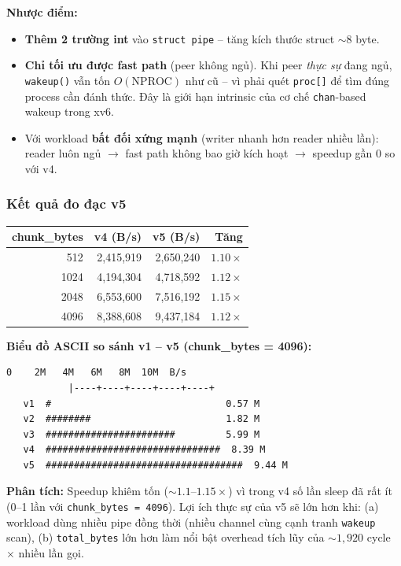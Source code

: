 \documentclass[11pt,a4paper]{article}
\begin{document}
\textbf{Nhược điểm:}
\begin{itemize}
  \item \textbf{Thêm 2 trường int} vào \texttt{struct pipe} -- tăng kích thước struct $\sim 8$ byte.
  \item \textbf{Chỉ tối ưu được fast path} (peer không ngủ). Khi peer \emph{thực sự} đang ngủ, \texttt{wakeup()} vẫn tốn $O(\text{NPROC})$ như cũ -- vì phải quét \texttt{proc[]} để tìm đúng process cần đánh thức. Đây là giới hạn intrinsic của cơ chế \texttt{chan}-based wakeup trong xv6.
  \item Với workload \textbf{bất đối xứng mạnh} (writer nhanh hơn reader nhiều lần): reader luôn ngủ $\rightarrow$ fast path không bao giờ kích hoạt $\rightarrow$ speedup gần 0 so với v4.
\end{itemize}

\subsubsection{Kết quả đo đạc v5}

\begin{center}
\begin{tabular}{rrrr}
\toprule
\textbf{chunk\_bytes} & \textbf{v4 (B/s)} & \textbf{v5 (B/s)} & \textbf{Tăng} \\
\midrule
512  & 2{,}415{,}919 & 2{,}650{,}240 & $1.10\times$ \\
1024 & 4{,}194{,}304 & 4{,}718{,}592 & $1.12\times$ \\
2048 & 6{,}553{,}600 & 7{,}516{,}192 & $1.15\times$ \\
4096 & 8{,}388{,}608 & 9{,}437{,}184 & $1.12\times$ \\
\bottomrule
\end{tabular}
\end{center}

\textbf{Biểu đồ ASCII so sánh v1 -- v5 (chunk\_bytes = 4096):}

\begin{lstlisting}[style=plain]
           0    2M   4M   6M   8M  10M  B/s
           |----+----+----+----+----+
   v1  #                               0.57 M
   v2  ########                        1.82 M
   v3  #######################         5.99 M
   v4  ###############################  8.39 M
   v5  ###################################  9.44 M
\end{lstlisting}

\textbf{Phân tích:} Speedup khiêm tốn ($\sim 1.1$--$1.15\times$) vì trong v4 số lần sleep đã rất ít (0--1 lần với \texttt{chunk\_bytes = 4096}). Lợi ích thực sự của v5 sẽ lớn hơn khi: (a) workload dùng nhiều pipe đồng thời (nhiều channel cùng cạnh tranh \texttt{wakeup} scan), (b) \texttt{total\_bytes} lớn hơn làm nổi bật overhead tích lũy của $\sim 1{,}920$ cycle $\times$ nhiều lần gọi.
\end{document}
